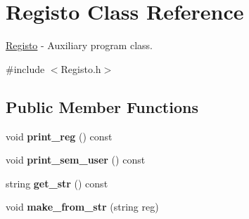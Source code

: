 \hypertarget{class_registo}{\section{Registo Class Reference}
\label{class_registo}
}


\hyperlink{class_registo}{Registo} -\/ Auxiliary program class.  




{\ttfamily \#include $<$Registo.\+h$>$}

\subsection*{Public Member Functions}
\begin{DoxyCompactItemize}
\item 
\hypertarget{class_registo_a17d5d8a67903e30624817b5798c6065e}{void {\bfseries print\+\_\+reg} () const }\label{class_registo_a17d5d8a67903e30624817b5798c6065e}

\item 
\hypertarget{class_registo_a80d93fbe1e4ea760aea6e3cf74a8bcce}{void {\bfseries print\+\_\+sem\+\_\+user} () const }\label{class_registo_a80d93fbe1e4ea760aea6e3cf74a8bcce}

\item 
\hypertarget{class_registo_ad0220e2d516af222c01893634eace4d4}{string {\bfseries get\+\_\+str} () const }\label{class_registo_ad0220e2d516af222c01893634eace4d4}

\item 
\hypertarget{class_registo_aa377d8fc39a2efda5ae6452f618635c2}{void {\bfseries make\+\_\+from\+\_\+str} (string reg)}\label{class_registo_aa377d8fc39a2efda5ae6452f618635c2}

\end{DoxyCompactItemize}
